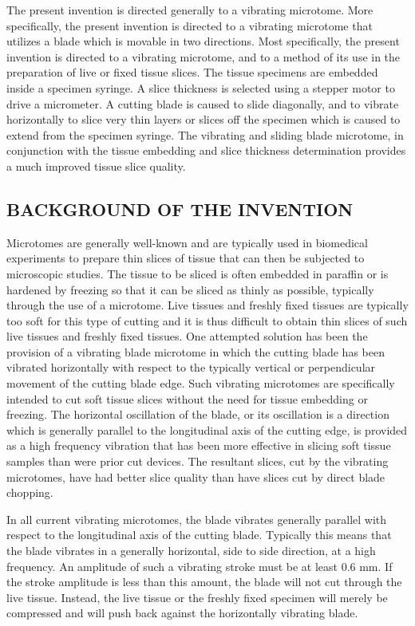 \documentclass{article}
\begin{document}
The present invention is directed generally to a vibrating microtome. More specifically, the present invention is directed to a vibrating microtome that utilizes a blade which is movable in two directions. Most specifically, the present invention is directed to a vibrating microtome, and to a method of its use in the preparation of live or fixed tissue slices. The tissue specimens are embedded inside a specimen syringe. A slice thickness is selected using a stepper motor to drive a micrometer. A cutting blade is caused to slide diagonally, and to vibrate horizontally to slice very thin layers or slices off the specimen which is caused to extend from the specimen syringe. The vibrating and sliding blade microtome, in conjunction with the tissue embedding and slice thickness determination provides a much improved tissue slice quality.

\subsection*{BACKGROUND OF THE INVENTION}

Microtomes are generally well-known and are typically used in biomedical experiments to prepare thin slices of tissue that can then be subjected to microscopic studies. The tissue to be sliced is often embedded in paraffin or is hardened by freezing so that it can be sliced as thinly as possible, typically through the use of a microtome. Live tissues and freshly fixed tissues are typically too soft for this type of cutting and it is thus difficult to obtain thin slices of such live tissues and freshly fixed tissues. One attempted solution has been the provision of a vibrating blade microtome in which the cutting blade has been vibrated horizontally with respect to the typically vertical or perpendicular movement of the cutting blade edge. Such vibrating microtomes are specifically intended to cut soft tissue slices without the need for tissue embedding or freezing. The horizontal oscillation of the blade, or its oscillation is a direction which is generally parallel to the longitudinal axis of the cutting edge, is provided as a high frequency vibration that has been more effective in slicing soft tissue samples than were prior cut devices. The resultant slices, cut by the vibrating microtomes, have had better slice quality than have slices cut by direct blade chopping.

In all current vibrating microtomes, the blade vibrates generally parallel with respect to the longitudinal axis of the cutting blade. Typically this means that the blade vibrates in a generally horizontal, side to side direction, at a high frequency. An amplitude of such a vibrating stroke must be at least 0.6 mm. If the stroke amplitude is less than this amount, the blade will not cut through the live tissue. Instead, the live tissue or the freshly fixed specimen will merely be compressed and will push back against the horizontally vibrating blade.
\end{document}
